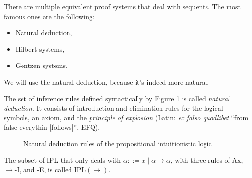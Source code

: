 There are multiple equivalent proof systems that deal with sequents. The most famous ones are the following:
\begin{itemize}
    \item Natural deduction,
    \item Hilbert systems,
    \item Gentzen systems.
\end{itemize}
We will use the natural deduction, because it's indeed more natural.

\begin{definition}
The set of inference rules defined syntactically by Figure \ref{fig:intuitionistic-logic-natural-deduction} is called \textit{natural deduction}. It consists of introduction and elimination rules for the logical symbols, an axiom, and the \textit{principle of explosion} (Latin: \textit{ex falso quodlibet} ``from false everythin [follows]'', EFQ).
\end{definition}

\begin{figure}
    \centering
    
    \caption{Natural deduction rules of the propositional intuitionistic logic}
    \label{fig:intuitionistic-logic-natural-deduction}
\end{figure}

The subset of IPL that only deals with $\alpha ::= x \mid \alpha \rightarrow \alpha$, with three rules of Ax, $\rightarrow$-I, and -E, is called IPL$(\rightarrow)$.